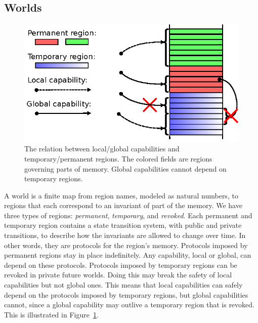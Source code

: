 \documentclass[format=acmsmall, review=true, screen=true]{acmart}
\renewcommand{\figurename}{Figure}
\newcommand\lau[1]{{\color{purple} \sf \footnotesize {LS: #1}}\\}
\newcommand\dominique[1]{{\color{purple} \sf \footnotesize {DD: #1}}\\}
\renewcommand\lau[1]{}
\renewcommand\dominique[1]{}
\newcommand{\plainview}[1]{\mathrm{#1}}
\newcommand{\perma}{\plainview{perm}}
\newcommand{\temp}{\plainview{temp}}
\newcommand{\revoked}{\plainview{revoked}}
\begin{document}
\subsection{Worlds}
\label{subsec:worlds}
\begin{figure}[htb]
  \centering
  \includegraphics{w11}

  \caption{The relation between local/global capabilities and temporary/permanent
    regions. The colored fields are regions governing parts of memory. Global capabilities cannot depend on temporary
    regions.}
  \label{fig:cap-world}
\end{figure}


A world is a
finite map from region names, modeled as natural numbers, to regions that each
correspond to an invariant of part of the memory.  We have three types of
regions: \emph{permanent}, \emph{temporary}, and \emph{revoked}.
Each permanent and temporary region contains a state transition system, with
public and private transitions, to describe how the invariants are allowed to
change over time. In other words, they are protocols for the region's
memory. Protocols
imposed by permanent regions stay in place indefinitely. Any capability, local
or global, can depend on these protocols. Protocols imposed by temporary regions
can be revoked in private future worlds. Doing this may break the safety of
local capabilities but not global ones. This means that local capabilities
can safely depend on the protocols imposed by temporary regions, but global
capabilities cannot, since a global capability may outlive a temporary region
that is revoked. This is illustrated in \figurename~\ref{fig:cap-world}.
\end{document}
